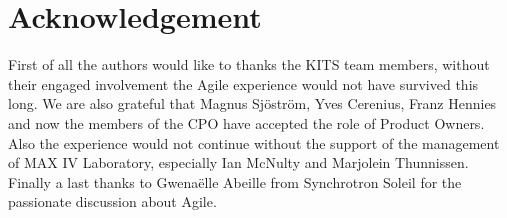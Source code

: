 \documentclass[a4paper,
              ]{jacow}
\begin{document}
\section{Acknowledgement}
First of all the authors would like to thanks the KITS team members, without their engaged involvement the Agile experience would not have survived this long. We are also grateful that Magnus Sjöström, Yves Cerenius, Franz Hennies and now the members of the CPO have accepted the role of Product Owners. Also the experience would not continue without the support of the management of MAX IV Laboratory, especially Ian McNulty and Marjolein Thunnissen.
Finally a last thanks to Gwenaëlle Abeille from Synchrotron Soleil for the passionate discussion about Agile.

%
%




\end{document}
